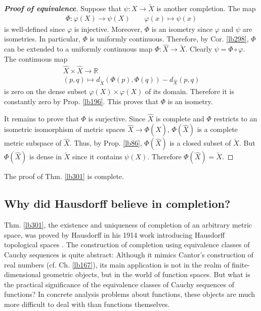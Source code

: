 \documentclass[12pt,b5paper,notitlepage]{article}
\theoremstyle{definition}
\theoremstyle{plain}
\newcommand{\wtd}{\widetilde}
\newcommand{\wht}{\widehat}
\newcommand{\Rbb}{\mathbb R}
\numberwithin{equation}{section}
\begin{document}
\begin{proof}[\textbf{Proof of equivalence}]
Suppose that $\psi:X\rightarrow\wtd X$ is another completion. The map
\begin{gather*}
\Phi:\varphi(X)\rightarrow \psi(X)\qquad \varphi(x)\mapsto\psi(x)
\end{gather*}
is well-defined since $\varphi$ is injective. Moreover, $\Phi$ is an isometry since $\varphi$ and $\psi$ are isometries. In particular, $\Phi$ is uniformly continuous. Therefore, by Cor. \ref{lb298}, $\Phi$ can be extended to a uniformly continuous map $\Phi:\wht X\rightarrow\wtd X$. Clearly $\psi=\Phi\circ\varphi$. The continuous map
\begin{gather*}
\wht X\times\wht X\rightarrow \Rbb\\
(p,q)\mapsto d_{\wtd X}(\Phi(p),\Phi(q))-d_{\wht X}(p,q)
\end{gather*}
is zero on the dense subset $\varphi(X)\times \varphi(X)$ of its domain. Therefore it is constantly zero by Prop. \ref{lb196}. This proves that $\Phi$ is an isometry.

It remains to prove that $\Phi$ is surjective. Since $\wht X$ is complete and $\Phi$ restricts to an isometric isomorphism of metric spaces $\wht X\rightarrow\Phi(\wht X)$, $\Phi(\wht X)$ is a complete metric subspace of $\wht X$. Thus, by Prop. \ref{lb86}, $\Phi(\wht X)$ is a closed subset of $\wtd X$. But $\Phi(\wht X)$ is dense in $\wtd X$ since it contains $\psi(X)$. Therefore $\Phi(\wht X)=\wtd X$.
\end{proof}

The proof of Thm. \ref{lb301} is complete.





\subsection{Why did Hausdorff believe in completion?}\label{lb549}


Thm. \ref{lb301}, the existence and uniqueness of completion of an arbitrary metric space, was proved by Hausdorff in his 1914 work introducing Hausdorff topological spaces \cite[Sec. 8.8, p.315]{Hau14}. The construction of completion using equivalence classes of Cauchy sequences is quite abstract: Although it mimics  Cantor's construction of real numbers (cf. Ch. \ref{lb167}), its main application is not in the realm of finite-dimensional geometric objects, but in the world of function spaces. But what is the practical significance of the equivalence classes of Cauchy sequences of functions? In concrete analysis problems about functions, these objects are much more difficult to deal with than functions themselves.
\end{document}
